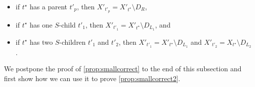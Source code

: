 \documentclass[a4paper,UKenglish,cleveref, autoref, thm-restate, numberwithinsect]{lipics-v2021}
\begin{document}
\begin{lemma}
\begin{itemize}
\begin{itemize}
    \item if $t^{\star}$ has a parent $t'_p$, then $X'_{t'_p}=X'_{t^{\star}}\setminus D_R$, 
    \item if $t^{\star}$ has one $S$-child $t'_1$, then $X'_{t'_1}=X'_{t^{\star}}\setminus D_{L_1}$, and 
    \item if $t^{\star}$ has two $S$-children $t'_1$ and $t'_2$, then $X'_{t'_1}=X'_{t^{\star}}\setminus D_{L_1}$ and $X'_{t'_2}=X_{t^{\star}}\setminus D_{L_2}$.
\end{itemize}
\end{itemize}
\end{lemma}

We postpone the proof of \cref{prop:smallcorrect} to the end of this subsection and first show how we can use it to prove \cref{prop:smallcorrect2}.
\end{document}
